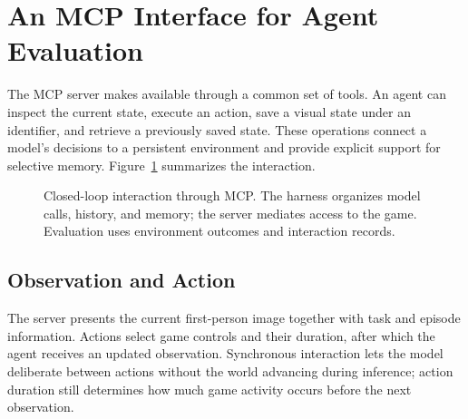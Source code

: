 \section{An MCP Interface for Agent Evaluation}
\label{sec:mcp}
The MCP server makes \vzd{} available through a common set of tools. An agent can inspect the current state, execute an action, save a visual state under an identifier, and retrieve a previously saved state. These operations connect a model's decisions to a persistent environment and provide explicit support for selective memory. Figure~\ref{fig:interaction} summarizes the interaction.

\begin{figure}[t]
\centering
{}
\caption{Closed-loop interaction through MCP. The harness organizes model calls, history, and memory; the server mediates access to the game. Evaluation uses environment outcomes and interaction records.}
\label{fig:interaction}
\end{figure}

\subsection{Observation and Action}
The server presents the current first-person image together with task and episode information. Actions select game controls and their duration, after which the agent receives an updated observation. Synchronous interaction lets the model deliberate between actions without the world advancing during inference; action duration still determines how much game activity occurs before the next observation.

